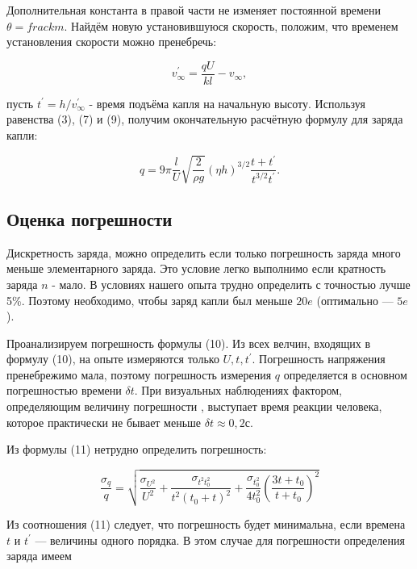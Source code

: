 \documentclass[a4paper,12pt]{article} %
\begin{document}
Дополнительная константа в правой части не изменяет постоянной времени $\theta = frac{k}{m}$. Найдём новую установившуюся скорость, положим, что временем установления скорости можно пренебречь:

\begin{equation}
    v_{\infty}^{'} = \frac{qU}{kl} - v_{\infty},
\end{equation}

пусть $t^{'} = h/v^{'}_{\infty}$ - время подъёма капля на начальную высоту. Используя равенства (3), (7) и (9), получим окончательную расчётную формулу для заряда капли:

\begin{equation}
    q = 9\pi \frac{l}{U} \sqrt{\frac{2}{\rho g}} (\eta h)^{3/2} \frac{t + t^{'}}{t^{3/2} t^{'}}.
\end{equation}

\subsection*{Оценка погрешности}

Дискретность заряда, можно определить если только погрешность заряда много меньше элементарного заряда. Это условие легко выполнимо если кратность заряда $n$ - мало. В условиях нашего опыта трудно определить  с точностью лучше 5\%. Поэтому необходимо, чтобы заряд капли был меньше $20e$ (оптимально
— $5e$).

Проанализируем погрешность формулы (10). Из всех велчин, входящих в формулу (10), на опыте измеряются только $U, t, t^{'}$. Погрешность напряжения пренебрежимо мала, поэтому погрешность измерения $q$  определяется в основном погрешностью времени $\delta t$.
При визуальных наблюдениях фактором, определяющим величину погрешности , выступает время реакции человека, которое практически не бывает меньше $
\delta t \approx 0,2 с.$

Из формулы (11) нетрудно определить погрешность:

\begin{equation}
    \frac{\sigma_{q}}{q} = \sqrt{{\frac{\sigma_{U^{2}}}{U^{2}} + \frac{\sigma_{t^{2} t_{0}^{2}}}{t^{2} (t_{0}+t)^{2}}} + \frac{\sigma_{t_{0}^{2}}}{4t_{0}^{2}} \left(\frac{3 t + t_{0}}{t + t_{0}}\right)^{2}}
\end{equation}

Из соотношения (11) следует, что погрешность будет минимальна, если
времена $t \text{ и } t^{'}$ — величины одного порядка. В этом случае для
погрешности определения заряда имеем
\end{document}
